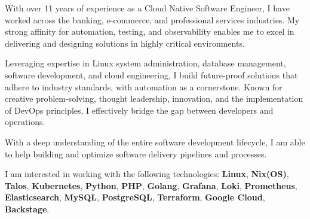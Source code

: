 
\begin{cvparagraph}
With over 11 years of experience as a Cloud Native Software Engineer, I have worked across the banking, e-commerce, and professional services industries. 
My strong affinity for automation, testing, and observability enables me to excel in delivering and designing solutions in highly critical environments. 

Leveraging expertise in Linux system administration, database management, software development, and cloud engineering, 
I build future-proof solutions that adhere to industry standards, with automation as a cornerstone. Known for creative problem-solving, thought leadership, innovation, and the implementation of DevOps principles, I effectively bridge the gap between developers and operations. 

With a deep understanding of the entire software development lifecycle, I am able to help building and optimize software delivery pipelines and processes.

I am interested in working with the following technologies: \textbf{Linux}, \textbf{Nix(OS)}, \textbf{Talos}, \textbf{Kubernetes}, \textbf{Python}, \textbf{PHP}, \textbf{Golang}, \textbf{Grafana}, \textbf{Loki}, \textbf{Prometheus}, \textbf{Elasticsearch},
 \textbf{MySQL}, \textbf{PostgreSQL}, \textbf{Terraform}, \textbf{Google Cloud}, \textbf{Backstage}.


\end{cvparagraph}

